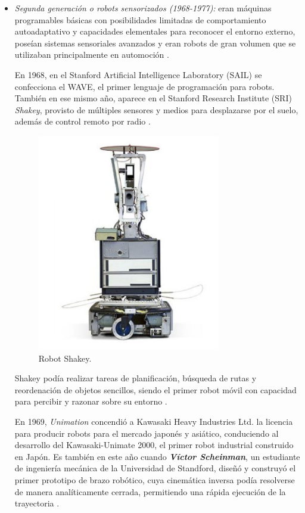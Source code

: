 \begin{itemize}
  \item \textit{Segunda generación o robots sensorizados (1968-1977):} eran máquinas programables básicas con posibilidades limitadas de comportamiento autoadaptativo y capacidades elementales para reconocer el entorno externo, poseían sistemas sensoriales avanzados y eran robots de gran volumen que se utilizaban principalmente en automoción \cite{Zamalloa17}.

  En 1968, en el Stanford Artificial Intelligence Laboratory (SAIL) se confecciona el WAVE, el primer lenguaje de programación para robots. También en ese mismo año, aparece en el Stanford Research Institute (SRI) \emph{Shakey}, provisto de múltiples sensores y medios para desplazarse por el suelo, además de control remoto por radio \cite{Sanchez07b}.
  
  \begin{figure} [h!]
    \begin{center}
      \includegraphics[width=8cm]{figs/Shakey.png}
    \end{center}
    \caption{Robot Shakey.}
    \label{fig:shakey}
  \end{figure}

  Shakey podía realizar tareas de planificación, búsqueda de rutas y reordenación de objetos sencillos, siendo el primer robot móvil con capacidad para percibir y razonar sobre su entorno \cite{sri}.
  
  \pagebreak
  
  En 1969, \emph{Unimation} concendió a Kawasaki Heavy Industries Ltd. la licencia para producir robots para el mercado japonés y asiático, conduciendo al desarrollo del Kawasaki-Unimate 2000, el primer robot industrial construido en Japón. Es también en este año cuando \textbf{\emph{Víctor Scheinman}}, un estudiante de ingeniería mecánica de la Universidad de Standford, diseñó y construyó el primer prototipo de brazo robótico, cuya cinemática inversa podía resolverse de manera analíticamente cerrada, permitiendo una rápida ejecución de la trayectoria \cite{Gasparetto19}. 


\end{itemize}
